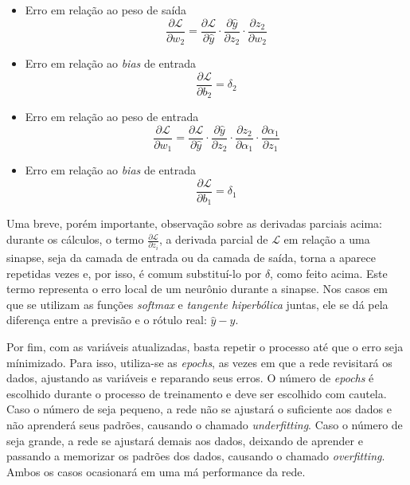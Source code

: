 \documentclass[12pt]{article}
\begin{document}
\begin{itemize}
    \item Erro em relação ao peso de saída
    \[
    \frac{\partial \mathscr{L}}{\partial w_2} =
    \frac{\partial \mathscr{L}}{\partial \hat{y}} \cdot
    \frac{\partial \hat{y}}{\partial z_2} \cdot
    \frac{\partial z_2}{\partial w_2}
    \]

    \item Erro em relação ao \textit{bias} de entrada
    \[
    \frac{\partial \mathscr{L}}{\partial b_2} = \delta_2
    \]

    \item Erro em relação ao peso de entrada
    \[
    \frac{\partial \mathscr{L}}{\partial w_1} =
    \frac{\partial \mathscr{L}}{\partial \hat{y}} \cdot
    \frac{\partial \hat{y}}{\partial z_2} \cdot
    \frac{\partial z_2}{\partial \alpha_1} \cdot
    \frac{\partial \alpha_1}{\partial z_1}
    \]

    \item Erro em relação ao \textit{bias} de entrada
    \[
    \frac{\partial \mathscr{L}}{\partial b_1} = \delta_1
    \]
\end{itemize}

Uma breve, porém importante, observação sobre as derivadas parciais acima: durante os cálculos, o termo $\frac{\partial \mathscr{L}}{\partial z_i}$, a derivada parcial de $\mathscr{L}$ em relação a uma sinapse, seja da camada de entrada ou da camada de saída, torna a aparece repetidas vezes e, por isso, é comum substituí-lo por $\delta$, como feito acima. Este termo representa o erro local de um neurônio durante a sinapse. Nos casos em que se utilizam as funções \textit{softmax} e \textit{tangente hiperbólica} juntas, ele se dá pela diferença entre a previsão e o rótulo real: $\hat{y} - y$.

Por fim, com as variáveis atualizadas, basta repetir o processo até que o erro seja mínimizado. Para isso, utiliza-se as \textit{epochs}, as vezes em que a rede revisitará os dados, ajustando as variáveis e reparando seus erros. O número de \textit{epochs} é escolhido durante o processo de treinamento e deve ser escolhido com cautela. Caso o número de  seja pequeno, a rede não se ajustará o suficiente aos dados e não aprenderá seus padrões, causando o chamado \textit{underfitting}. Caso o número de  seja grande, a rede se ajustará demais aos dados, deixando de aprender e passando a memorizar os padrões dos dados, causando o chamado \textit{overfitting}. Ambos os casos ocasionará em uma má performance da rede.
\end{document}
